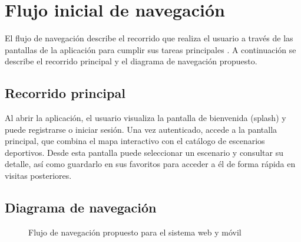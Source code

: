 
\section{Flujo inicial de navegaci\'on}

El flujo de navegaci\'on describe el recorrido que realiza el usuario a trav\'es
de las pantallas de la aplicaci\'on para cumplir sus tareas principales
\citep{pressman2010}. A continuaci\'on se describe el recorrido principal y el
diagrama de navegaci\'on propuesto.

\subsection{Recorrido principal}

Al abrir la aplicaci\'on, el usuario visualiza la pantalla de bienvenida
(splash) y puede registrarse o iniciar sesi\'on. Una vez autenticado, accede a
la pantalla principal, que combina el mapa interactivo con el cat\'alogo de
escenarios deportivos. Desde esta pantalla puede seleccionar un escenario y
consultar su detalle, as\'i como guardarlo en sus favoritos para acceder a \'el
de forma r\'apida en visitas posteriores.

\subsection{Diagrama de navegaci\'on}

\begin{figure}[H]
  \centering
  \caption{Flujo de navegaci\'on propuesto para el sistema web y m\'ovil}
\end{figure}
